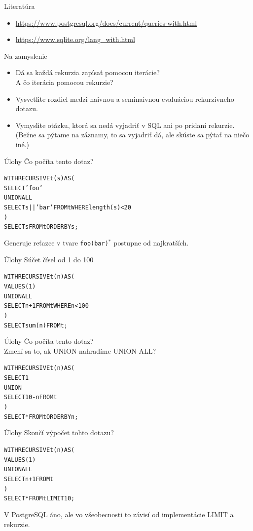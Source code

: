 \documentclass[12pt]{beamer}
\def\blue#1{\textcolor{Cerulean}{#1}}
\begin{document}
\begin{frame}{Literatúra}
\begin{itemize}
\item {\scriptsize\url{https://www.postgresql.org/docs/current/queries-with.html}}
\item {\scriptsize\url{https://www.sqlite.org/lang_with.html}}
\end{itemize}
\end{frame}


\begin{frame}{Na zamyslenie}
\begin{itemize}
\item Dá sa každá rekurzia zapísať pomocou iterácie?\\ A čo iterácia pomocou rekurzie?
\item Vysvetlite rozdiel medzi naivnou a seminaivnou evaluáciou rekurzívneho dotazu.
\item Vymyslite otázku, ktorá sa nedá vyjadriť v SQL ani po pridaní rekurzie.
    (Bežne sa pýtame na záznamy, to sa vyjadriť dá, ale skúste sa pýtať na niečo iné.)
\end{itemize}
\end{frame}


\begin{frame}[fragile]{Úlohy}
Čo počíta tento dotaz?
\bigskip
{\small
\begin{alltt}
WITH RECURSIVE t(s) AS (
    SELECT 'foo'
  UNION ALL
    SELECT s || 'bar' FROM t WHERE length(s) < 20
)
SELECT s FROM t ORDER BY s;
\end{alltt}
}
\bigskip
\pause
Generuje reťazce v tvare \verb|foo(bar)|$^*$ postupne od najkratších.
\end{frame}


\begin{frame}[fragile]{Úlohy}
Súčet čísel od 1 do 100
\pause
\bigskip
{\small
\begin{alltt}
WITH RECURSIVE t(n) AS (
    VALUES (1)
  UNION ALL
    SELECT n+1 FROM t WHERE n < 100
)
SELECT sum(n) FROM t;
\end{alltt}
}
\end{frame}


\begin{frame}[fragile]{Úlohy}
Čo počíta tento dotaz?\\
Zmení sa to, ak UNION nahradíme UNION ALL?
\bigskip
{\small
\begin{alltt}
WITH RECURSIVE t(n) AS (
    SELECT 1
  \blue{UNION}
    SELECT 10-n FROM t
)
SELECT * FROM t ORDER BY n;
\end{alltt}
}
\end{frame}


\begin{frame}[fragile]{Úlohy}
Skončí výpočet tohto dotazu?
\bigskip
{\small
\begin{alltt}
WITH RECURSIVE t(n) AS (
    VALUES (1)
  UNION ALL
    SELECT n+1 FROM t
)
SELECT * FROM t LIMIT 10;
\end{alltt}
}
\bigskip
\pause
V PostgreSQL áno, ale vo všeobecnosti to závisí od implementácie LIMIT a rekurzie.
\end{frame}
\end{document}
